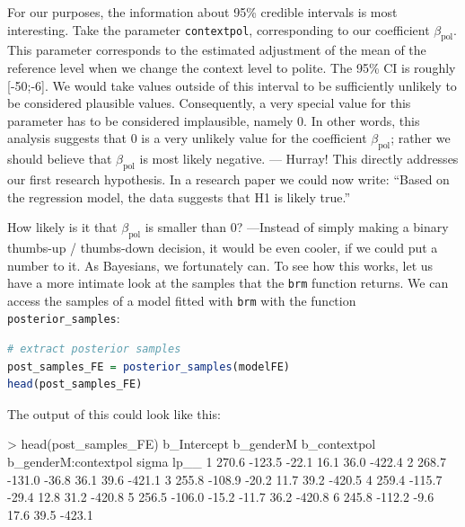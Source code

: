 \documentclass[nobib]{tufte-handout}
\begin{document}
For our purposes, the information about 95\% credible intervals is most interesting. Take the parameter \texttt{contextpol}, corresponding to our coefficient $\beta_{\text{pol}}$. This parameter corresponds to the estimated adjustment of the mean of the reference level when we change the context level to polite. The 95\% CI is roughly [-50;-6]. We would take values outside of this interval to be sufficiently unlikely to be considered plausible values. Consequently, a very special value for this parameter has to be considered implausible, namely 0. In other words, this analysis suggests that 0 is a very unlikely value for the coefficient $\beta_{\text{pol}}$; rather we should believe that $\beta_{\text{pol}}$ is most likely negative. --- Hurray! This directly addresses our first research hypothesis. In a research paper we could now write: ``Based on the regression model, the data suggests that H1 is likely true.''

How likely is it that $\beta_{\text{pol}}$ is smaller than 0? ---Instead of simply making a binary thumbs-up / thumbs-down decision, it would be even cooler, if we could put a number to it. As Bayesians, we fortunately can. To see how this works, let us have a more intimate look at the samples that the \texttt{brm} function returns. We can access the samples of a model fitted with \texttt{brm} with the function \texttt{posterior\_samples}:

\begin{minipage}[]{\textwidth}
\begin{lstlisting}[language=R]
# extract posterior samples 
post_samples_FE = posterior_samples(modelFE)
head(post_samples_FE)
\end{lstlisting}
\end{minipage}

The output of this could look like this:

\medskip

\begin{minipage}[]{1.2\textwidth}
\begin{rc}
> head(post_samples_FE)
  b_Intercept b_genderM b_contextpol b_genderM:contextpol sigma   lp__
1       270.6    -123.5        -22.1                 16.1  36.0 -422.4
2       268.7    -131.0        -36.8                 36.1  39.6 -421.1
3       255.8    -108.9        -20.2                 11.7  39.2 -420.5
4       259.4    -115.7        -29.4                 12.8  31.2 -420.8
5       256.5    -106.0        -15.2                -11.7  36.2 -420.8
6       245.8    -112.2         -9.6                 17.6  39.5 -423.1
\end{rc}
\end{minipage}
\end{document}
